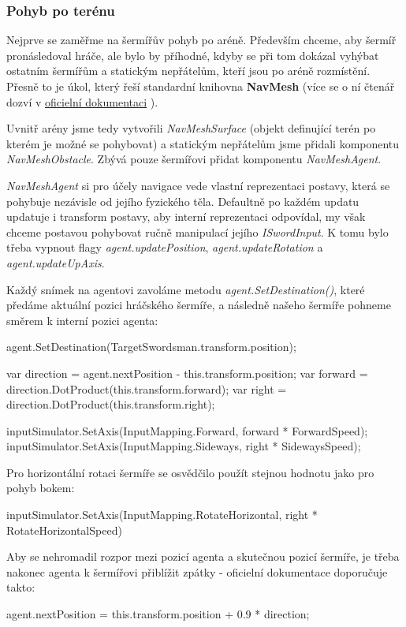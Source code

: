 \subsubsection*{Pohyb po terénu}

Nejprve se zaměřme na šermířův pohyb po aréně. Především chceme, aby šermíř pronásledoval hráče, ale bylo by příhodné, kdyby se při tom dokázal vyhýbat ostatním šermířům a statickým nepřátelům, kteří jsou po aréně rozmístění. Přesně to je úkol, který řeší standardní knihovna \textbf{NavMesh} (více se o ní čtenář dozví v \href{https://docs.unity3d.com/2022.2/Documentation/Manual/Navigation.html}{oficielní dokumentaci} \cite{Unity}).

Uvnitř arény jsme tedy vytvořili \textit{NavMeshSurface} (objekt definující terén po kterém je možné se pohybovat) a statickým nepřátelům jsme přidali komponentu \textit{NavMeshObstacle}. Zbývá pouze šermířovi přidat komponentu \textit{NavMeshAgent}.

\textit{NavMeshAgent} si pro účely navigace vede vlastní reprezentaci postavy, která se pohybuje nezávisle od jejího fyzického těla. Defaultně po každém updatu updatuje i transform postavy, aby interní reprezentaci odpovídal, my však chceme postavou pohybovat ručně manipulací jejího \textit{ISwordInput}. K tomu bylo třeba vypnout flagy \textit{agent.updatePosition}, \textit{agent.updateRotation} a \textit{agent.updateUpAxis}. 

Každý snímek na agentovi zavoláme metodu \textit{agent.SetDestination()}, které předáme aktuální pozici hráčského šermíře, a následně našeho šermíře pohneme směrem k interní pozici agenta:
\begin{code}
 agent.SetDestination(TargetSwordsman.transform.position);

 var direction = agent.nextPosition - this.transform.position;
 var forward = direction.DotProduct(this.transform.forward); 
 var right = direction.DotProduct(this.transform.right);
 
 inputSimulator.SetAxis(InputMapping.Forward, forward * ForwardSpeed);
 inputSimulator.SetAxis(InputMapping.Sideways, right * SidewaysSpeed);
\end{code}
Pro horizontální rotaci šermíře se osvědčilo použít stejnou hodnotu jako pro pohyb bokem:
\begin{code}
 inputSimulator.SetAxis(InputMapping.RotateHorizontal, 
                        right * RotateHorizontalSpeed)
\end{code}
Aby se nehromadil rozpor mezi pozicí agenta a skutečnou pozicí šermíře, je třeba nakonec agenta k šermířovi přiblížit zpátky - oficielní dokumentace doporučuje takto:
\begin{code}
 agent.nextPosition = this.transform.position + 0.9 * direction;
\end{code} 

